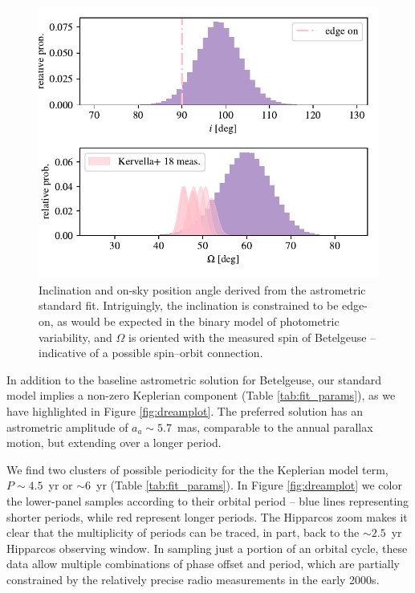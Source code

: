 \documentclass[twocolumn]{aastex631}
\begin{document}
\begin{figure}
    \centering
    \includegraphics[width=\linewidth]{figures/mutual_inc.pdf}
    \caption{Inclination and on-sky position angle derived from the astrometric standard fit. Intriguingly, the inclination is constrained to be edge-on, as would be expected in the binary model of photometric variability, and $\Omega$ is oriented with the measured spin  \citep{2018A&A...609A..67K} of Betelgeuse -- indicative of a possible spin--orbit connection. } 
    \label{fig:angles}
\end{figure}



In addition to the baseline astrometric solution for Betelgeuse, our standard model implies a non-zero Keplerian component (Table \ref{tab:fit_params}), as we have highlighted in Figure \ref{fig:dreamplot}. The preferred solution has an astrometric amplitude of $a_a\sim 5.7$~mas, comparable to the annual parallax motion, but extending over a longer period. 

We find two clusters of possible periodicity for the the Keplerian model term, $P\sim 4.5$~yr or $\sim6$~yr (Table \ref{tab:fit_params}). In Figure \ref{fig:dreamplot} we color the lower-panel samples according to their orbital period -- blue lines representing shorter periods, while red represent longer periods. The Hipparcos zoom makes it clear that the multiplicity of periods can be traced, in part, back to the $\sim 2.5$~yr Hipparcos observing window. In sampling just a portion of an orbital cycle, these data allow multiple combinations of phase offset and period, which are partially constrained by the relatively precise radio measurements in the early 2000s. 
\end{document}
